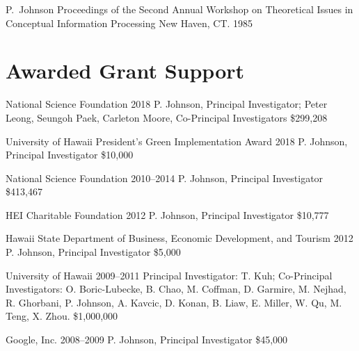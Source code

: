 \documentclass[11pt,letterpaper,sans]{moderncv} %
\begin{document}
          {P.~Johnson}
          {Proceedings of the Second Annual Workshop on Theoretical Issues in Conceptual Information Processing}
          {New Haven, CT.  1985}

\section{Awarded Grant Support}

        {National Science Foundation} %
        {2018} %
        {P. Johnson, Principal Investigator; Peter Leong, Seungoh Paek, Carleton Moore, Co-Principal Investigators}  %
        {\$299,208} %

        {University of Hawaii President's Green Implementation Award} %
        {2018} %
        {P. Johnson, Principal Investigator}  %
        {\$10,000} %

        {National Science Foundation} %
        {2010--2014} %
        {P. Johnson, Principal Investigator}  %
        {\$413,467} %

            {HEI Charitable Foundation}
            {2012}
            {P. Johnson, Principal Investigator}
            {\$10,777}

            {Hawaii State Department of Business, Economic Development, and Tourism} %
            {2012} %
            {P. Johnson, Principal Investigator}  %
            {\$5,000} %

        {University of Hawaii} %
        {2009--2011} %
        {Principal Investigator: T. Kuh; Co-Principal Investigators:  O. Boric-Lubecke, B. Chao, M. Coffman, D. Garmire, M. Nejhad, R. Ghorbani, P. Johnson, A. Kavcic, D. Konan, B. Liaw, E. Miller, W. Qu, M. Teng, X. Zhou.}  %
        {\$1,000,000} %

        {Google, Inc.} %
        {2008--2009} %
        {P. Johnson, Principal Investigator}  %
        {\$45,000} %
\end{document}
